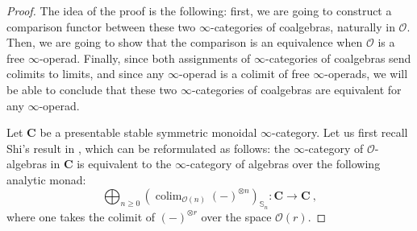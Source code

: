 \documentclass{proc-l}
\DeclareMathOperator*{\colim}{colim}
\theoremstyle{plain}
\theoremstyle{definition}
\theoremstyle{remark}
\begin{document}
\begin{proof}
The idea of the proof is the following: first, we are going to construct a comparison functor between these two $\infty$-categories of coalgebras, naturally in $\mathscr O$. Then, we are going to show that the comparison is an equivalence when $\mathscr{O}$ is a free $\infty$-operad. Finally, since both assignments of $\infty$-categories of coalgebras send colimits to limits, and since any $\infty$-operad is a colimit of free $\infty$-operads, we will be able to conclude that these two $\infty$-categories of coalgebras are equivalent for any $\infty$-operad.

Let $\mathbf{C}$ be a presentable stable symmetric monoidal $\infty$-category. Let us first recall Shi's result in \cite[Theorem A.2.0.3]{ShiPhD}, which can be reformulated as follows: the $\infty$-category of $\mathscr{O}$-algebras in $\mathbf{C}$ is equivalent to the $\infty$-category of algebras over the following analytic monad:
\[
\bigoplus_{n \geq 0} \left(\colim_{\mathscr{O}(n)} (-)^{\otimes n} \right)_{\mathbb{S}_n}: \mathbf{C} \longrightarrow \mathbf{C}~,
\]
where one takes the colimit of $(-)^{\otimes r}$ over the space $\mathscr{O}(r)$.


\end{proof}
\end{document}
